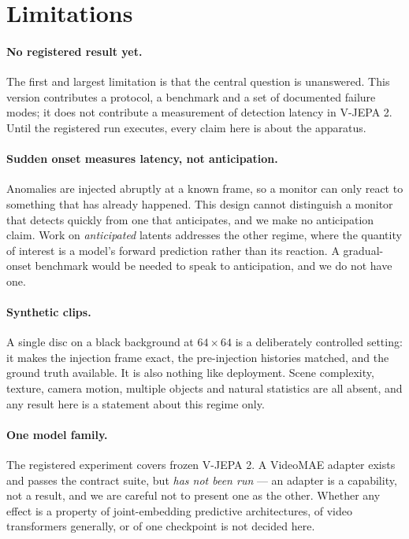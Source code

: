 \section{Limitations}
\label{sec:limitations}

\paragraph{No registered result yet.}
The first and largest limitation is that the central question is unanswered.
This version contributes a protocol, a benchmark and a set of documented failure
modes; it does not contribute a measurement of detection latency in V-JEPA 2.
Until the registered run executes, every claim here is about the apparatus.

\paragraph{Sudden onset measures latency, not anticipation.}
Anomalies are injected abruptly at a known frame, so a monitor can only react to
something that has already happened. This design cannot distinguish a monitor
that detects quickly from one that anticipates, and we make no anticipation
claim. Work on \emph{anticipated} latents \citep{samad2026puls} addresses the
other regime, where the quantity of interest is a model's forward prediction
rather than its reaction. A gradual-onset benchmark would be needed to speak to
anticipation, and we do not have one.

\paragraph{Synthetic clips.}
A single disc on a black background at $64 \times 64$ is a deliberately
controlled setting: it makes the injection frame exact, the pre-injection
histories matched, and the ground truth available. It is also nothing like
deployment. Scene complexity, texture, camera motion, multiple objects and
natural statistics are all absent, and any result here is a statement about this
regime only.

\paragraph{One model family.}
The registered experiment covers frozen V-JEPA 2. A VideoMAE adapter exists and
passes the contract suite, but \emph{has not been run} --- an adapter is a
capability, not a result, and we are careful not to present one as the other.
Whether any effect is a property of joint-embedding predictive architectures, of
video transformers generally, or of one checkpoint is not decided here.


